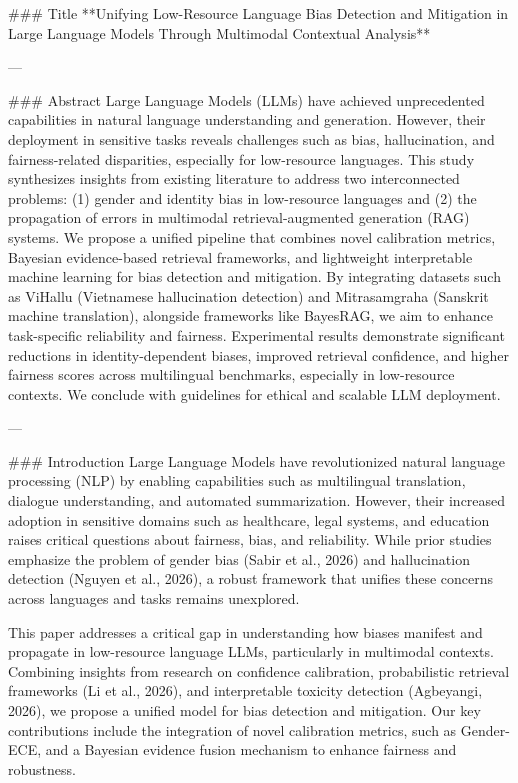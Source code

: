 ### Title
**Unifying Low-Resource Language Bias Detection and Mitigation in Large Language Models Through Multimodal Contextual Analysis**

---

### Abstract
Large Language Models (LLMs) have achieved unprecedented capabilities in natural language understanding and generation. However, their deployment in sensitive tasks reveals challenges such as bias, hallucination, and fairness-related disparities, especially for low-resource languages. This study synthesizes insights from existing literature to address two interconnected problems: (1) gender and identity bias in low-resource languages and (2) the propagation of errors in multimodal retrieval-augmented generation (RAG) systems. We propose a unified pipeline that combines novel calibration metrics, Bayesian evidence-based retrieval frameworks, and lightweight interpretable machine learning for bias detection and mitigation. By integrating datasets such as ViHallu (Vietnamese hallucination detection) and Mitrasamgraha (Sanskrit machine translation), alongside frameworks like BayesRAG, we aim to enhance task-specific reliability and fairness. Experimental results demonstrate significant reductions in identity-dependent biases, improved retrieval confidence, and higher fairness scores across multilingual benchmarks, especially in low-resource contexts. We conclude with guidelines for ethical and scalable LLM deployment.

---

### Introduction
Large Language Models have revolutionized natural language processing (NLP) by enabling capabilities such as multilingual translation, dialogue understanding, and automated summarization. However, their increased adoption in sensitive domains such as healthcare, legal systems, and education raises critical questions about fairness, bias, and reliability. While prior studies emphasize the problem of gender bias (Sabir et al., 2026) and hallucination detection (Nguyen et al., 2026), a robust framework that unifies these concerns across languages and tasks remains unexplored.

This paper addresses a critical gap in understanding how biases manifest and propagate in low-resource language LLMs, particularly in multimodal contexts. Combining insights from research on confidence calibration, probabilistic retrieval frameworks (Li et al., 2026), and interpretable toxicity detection (Agbeyangi, 2026), we propose a unified model for bias detection and mitigation. Our key contributions include the integration of novel calibration metrics, such as Gender-ECE, and a Bayesian evidence fusion mechanism to enhance fairness and robustness.

